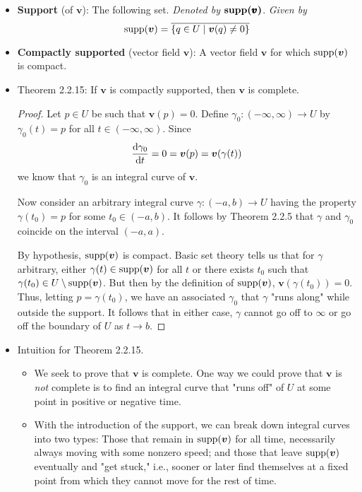 \documentclass[../notes.tex]{subfiles}
\begin{document}
\begin{itemize}
    \item \textbf{Support} (of $\bm{v}$): The following set. \emph{Denoted by} $\bm{\supp(\pmb{v})}$. \emph{Given by}
    \begin{equation*}
        \operatorname{supp}(\bm{v}) = \overline{\{q\in U\mid\bm{v}(q)\neq 0\}}
    \end{equation*}
    \item \textbf{Compactly supported} (vector field $\bm{v}$): A vector field $\bm{v}$ for which $\operatorname{supp}(\bm{v})$ is compact.
    \item Theorem 2.2.15: If $\bm{v}$ is compactly supported, then $\bm{v}$ is complete.
    \begin{proof}
        Let $p\in U$ be such that $\bm{v}(p)=0$. Define $\gamma_0:(-\infty,\infty)\to U$ by $\gamma_0(t)=p$ for all $t\in(-\infty,\infty)$. Since
        \begin{equation*}
            \dv{\gamma_0}{t} = 0 = \bm{v}(p) = \bm{v}(\gamma(t))
        \end{equation*}
        we know that $\gamma_0$ is an integral curve of $\bm{v}$.\par
        Now consider an arbitrary integral curve $\gamma:(-a,b)\to U$ having the property $\gamma(t_0)=p$ for some $t_0\in(-a,b)$. It follows by Theorem 2.2.5 that $\gamma$ and $\gamma_0$ coincide on the interval $(-a,a)$.\par
        By hypothesis, $\operatorname{supp}(\bm{v})$ is compact. Basic set theory tells us that for $\gamma$ arbitrary, either $\gamma(t)\in\operatorname{supp}(\bm{v})$ for all $t$ or there exists $t_0$ such that $\gamma(t_0)\in U\setminus\operatorname{supp}(\bm{v})$. But then by the definition of $\operatorname{supp}(\bm{v})$, $\bm{v}(\gamma(t_0))=0$. Thus, letting $p=\gamma(t_0)$, we have an associated $\gamma_0$ that $\gamma$ "runs along" while outside the support. It follows that in either case, $\gamma$ cannot go off to $\infty$ or go off the boundary of $U$ as $t\to b$.
    \end{proof}
    \item Intuition for Theorem 2.2.15.
    \begin{itemize}
        \item We seek to prove that $\bm{v}$ is complete. One way we could prove that $\bm{v}$ is \emph{not} complete is to find an integral curve that "runs off" of $U$ at some point in positive or negative time.
        \item With the introduction of the support, we can break down integral curves into two types: Those that remain in $\operatorname{supp}(\bm{v})$ for all time, necessarily always moving with some nonzero speed; and those that leave $\operatorname{supp}(\bm{v})$ eventually and "get stuck," i.e., sooner or later find themselves at a fixed point from which they cannot move for the rest of time.

\end{itemize}
\end{itemize}
\end{document}
